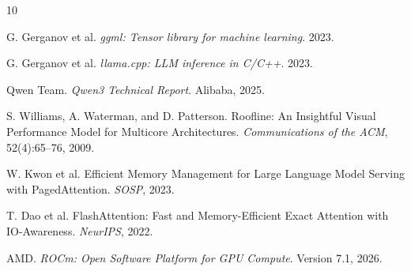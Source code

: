 \documentclass[11pt]{article}
\begin{document}
\begin{thebibliography}{10}

G. Gerganov et al. \textit{ggml: Tensor library for machine learning}. 2023.

G. Gerganov et al. \textit{llama.cpp: LLM inference in C/C++}. 2023.

Qwen Team. \textit{Qwen3 Technical Report}. Alibaba, 2025.

S. Williams, A. Waterman, and D. Patterson. Roofline: An Insightful Visual Performance Model for Multicore Architectures. \textit{Communications of the ACM}, 52(4):65--76, 2009.

W. Kwon et al. Efficient Memory Management for Large Language Model Serving with PagedAttention. \textit{SOSP}, 2023.

T. Dao et al. FlashAttention: Fast and Memory-Efficient Exact Attention with IO-Awareness. \textit{NeurIPS}, 2022.

AMD. \textit{ROCm: Open Software Platform for GPU Compute}. Version 7.1, 2026.

\end{thebibliography}
\end{document}
